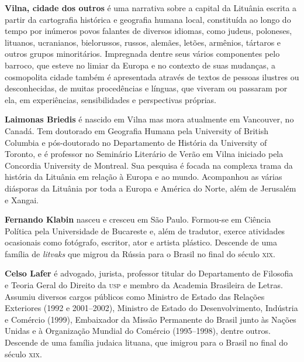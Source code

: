 \textbf{Vilna, cidade dos outros} é uma narrativa sobre a capital da Lituânia escrita a partir da cartografia histórica e geografia humana local, constituída ao longo do tempo por inúmeros povos falantes de diversos idiomas, como judeus, poloneses, lituanos, ucranianos, bielorussos, russos, alemães, letões, armênios, tártaros e outros grupos minoritários. Impregnada dentre seus vários componentes pelo barroco, que esteve no limiar da Europa e no contexto de suas mudanças, a cosmopolita cidade também é apresentada através de textos de pessoas ilustres ou desconhecidas, de muitas procedências e línguas, que viveram ou passaram por ela, em experiências, sensibilidades e perspectivas próprias.

\textbf{Laimonas Briedis} é nascido em Vilna mas mora atualmente em Vancouver, no Canadá. Tem doutorado em Geografia Humana pela University of British Columbia e pós-doutorado no Departamento de História da University of Toronto, e é professor no Seminário Literário de Verão em Vilna iniciado pela Concordia University de Montreal. Sua pesquisa é focada na complexa trama da história da Lituânia em relação à Europa e ao mundo. Acompanhou as várias diásporas da Lituânia por toda a Europa e América do Norte, além de Jerusalém e Xangai.

\textbf{Fernando Klabin} nasceu e cresceu em São Paulo. Formou-se em Ciência Política pela Universidade de Bucareste e, além de tradutor, exerce atividades ocasionais como fotógrafo, escritor, ator e artista plástico. Descende de uma família de \textit{litvaks} que migrou da Rússia para o Brasil no final do século \textsc{xix}.

\textbf{Celso Lafer} é advogado, jurista, professor titular do Departamento de Filosofia e Teoria Geral do Direito da \textsc{usp} e membro da Academia Brasileira de Letras. Assumiu diversos cargos públicos como Ministro de Estado das Relações Exteriores (1992 e 2001--2002), Ministro de Estado do Desenvolvimento, Indústria e Comércio (1999), Embaixador da Missão Permanente do Brasil junto às Nações Unidas e à Organização Mundial do Comércio (1995--1998), dentre outros. Descende de uma família judaica lituana, que imigrou para o Brasil no final do século \textsc{xix}. 